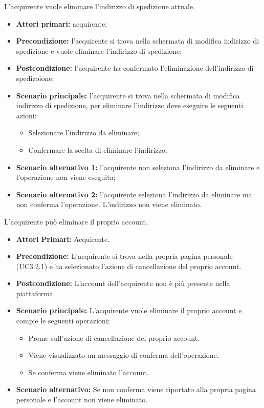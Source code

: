 L'acquirente vuole eliminare l'indirizzo di spedizione attuale.
\begin{itemize}
    \item \textbf{Attori primari:} acquirente;
    \item \textbf{Precondizione:}  l'acquirente si trova nella schermata di modifica indirizzo di spedizione e vuole eliminare l'indirizzo di spedizione;
    \item \textbf{Postcondizione:} l'acquirente ha confermato l'eliminazione dell'indirizzo di spedizoione;
    \item \textbf{Scenario principale:} l'acquirente si trova nella schermata di modifica indirizzo di spedizione, per eliminare l'indirizzo deve eseguire le seguenti azioni:
        \begin{itemize}
            \item Selezionare l'indirizzo da eliminare;
            \item Confermare la scelta di eliminare l'indirizzo.
        \end{itemize}
    \item \textbf{Scenario alternativo 1:} l'acquirente non seleziona l'indirizzo da eliminare e l'operazione non viene eseguita;
    \item \textbf{Scenario alternativo 2:} l'acquirente seleziona l'indirizzo da eliminare ma non conferma l'operazione. L'indirizzo non viene eliminato.
\end{itemize}


L'acquirente può eliminare il proprio account.
\begin{itemize}
    \item \textbf{Attori Primari:} Acquirente.
    \item \textbf{Precondizione:} L'acquirente si trova nella propria pagina personale (UC3.2.1) e ha selezionato l'azione di cancellazione del proprio account.
    \item \textbf{Postcondizione:} L'account dell'acquirente non è più presente nella piattaforma
    \item \textbf{Scenario principale:} L'acquirente vuole eliminare il proprio account e compie le seguenti operazioni:
    \begin{itemize}
        \item Preme sull'azione di cancellazione del proprio account.
        \item Viene visualizzato un messaggio di conferma dell'operazione.
        \item Se conferma viene eliminato l'account.
    \end{itemize}
    \item \textbf{Scenario alternativo:} Se non conferma viene riportato alla propria pagina personale e l'account non viene eliminato.
\end{itemize}

